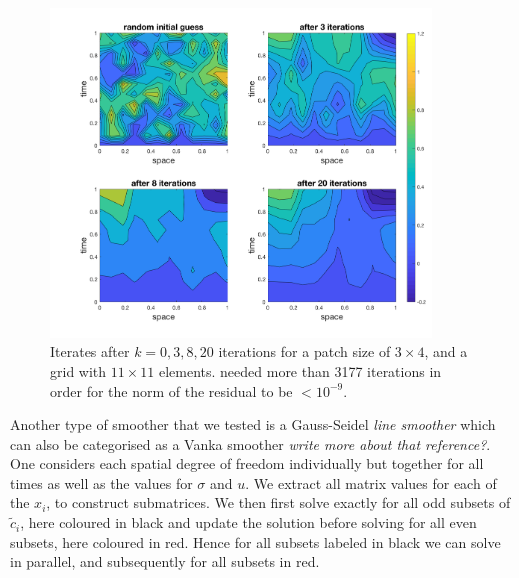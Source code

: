 \documentclass[../draft_1.tex]{subfiles}
\begin{document}
\begin{figure}[ht!]
	\centering
	\includegraphics[width=0.9\textwidth]{images/implementation/contour_plot_1_blk_size3by4}
	\caption{Iterates after $k = 0,3,8, 20$ iterations for a patch size of $3 \times 4$, and a grid with $11 \times 11$ elements. needed more than 3177 iterations in order for the norm of the residual to be $< 10^{-9}$.}
\end{figure}

Another type of smoother that we tested is a Gauss-Seidel \textit{line smoother} \cite{adams2001distributed} which can also be categorised as a Vanka smoother  \textit{write more about that reference?}. One considers each spatial degree of freedom individually but together for all times as well as the values for $\sigma$ and $u$. We extract all matrix values for each of the $x_i$, to construct submatrices. We then first solve exactly for all odd subsets of $\tilde{c}_i$, here coloured in black and update the solution before solving for all even subsets, here coloured in red. Hence for all subsets labeled in black we can solve in parallel, and subsequently for all subsets in red. 
\end{document}
